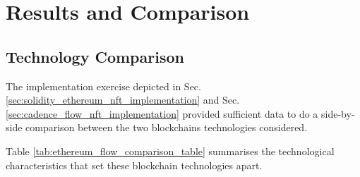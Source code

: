 \documentclass[../main.tex]{subfiles}
\begin{document}
\section{Results and Comparison}
\label{sec:results_and_comparison}

\subsection{Technology Comparison}
The implementation exercise depicted in Sec. \ref{sec:solidity_ethereum_nft_implementation} and Sec. \ref{sec:cadence_flow_nft_implementation} provided sufficient data to do a side-by-side comparison between the two blockchains technologies considered.
\par
Table \ref{tab:ethereum_flow_comparison_table} summarises the technological characteristics that set these blockchain technologies apart.
\end{document}
